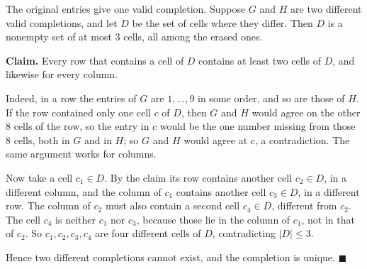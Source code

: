 The original entries give one valid completion. Suppose $G$ and $H$ are two different valid completions, and let $D$ be the set of cells where they differ. Then $D$ is a nonempty set of at most $3$ cells, all among the erased ones.

\textbf{Claim.} Every row that contains a cell of $D$ contains at least two cells of $D$, and likewise for every column.

Indeed, in a row the entries of $G$ are $1,\ldots,9$ in some order, and so are those of $H$. If the row contained only one cell $c$ of $D$, then $G$ and $H$ would agree on the other $8$ cells of the row, so the entry in $c$ would be the one number missing from those $8$ cells, both in $G$ and in $H$; so $G$ and $H$ would agree at $c$, a contradiction. The same argument works for columns.

Now take a cell $c_1\in D$. By the claim its row contains another cell $c_2\in D$, in a different column, and the column of $c_1$ contains another cell $c_3\in D$, in a different row. The column of $c_2$ must also contain a second cell $c_4\in D$, different from $c_2$. The cell $c_4$ is neither $c_1$ nor $c_3$, because those lie in the column of $c_1$, not in that of $c_2$. So $c_1,c_2,c_3,c_4$ are four different cells of $D$, contradicting $|D|\le3$.

Hence two different completions cannot exist, and the completion is unique. $\blacksquare$
